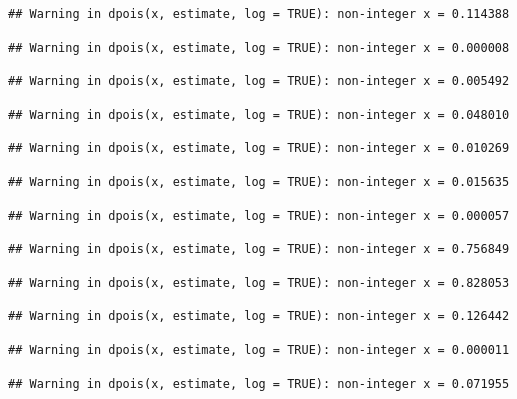 \documentclass[]{article}
\begin{document}
\begin{verbatim}
## Warning in dpois(x, estimate, log = TRUE): non-integer x = 0.114388
\end{verbatim}

\begin{verbatim}
## Warning in dpois(x, estimate, log = TRUE): non-integer x = 0.000008
\end{verbatim}

\begin{verbatim}
## Warning in dpois(x, estimate, log = TRUE): non-integer x = 0.005492
\end{verbatim}

\begin{verbatim}
## Warning in dpois(x, estimate, log = TRUE): non-integer x = 0.048010
\end{verbatim}

\begin{verbatim}
## Warning in dpois(x, estimate, log = TRUE): non-integer x = 0.010269
\end{verbatim}

\begin{verbatim}
## Warning in dpois(x, estimate, log = TRUE): non-integer x = 0.015635
\end{verbatim}

\begin{verbatim}
## Warning in dpois(x, estimate, log = TRUE): non-integer x = 0.000057
\end{verbatim}

\begin{verbatim}
## Warning in dpois(x, estimate, log = TRUE): non-integer x = 0.756849
\end{verbatim}

\begin{verbatim}
## Warning in dpois(x, estimate, log = TRUE): non-integer x = 0.828053
\end{verbatim}

\begin{verbatim}
## Warning in dpois(x, estimate, log = TRUE): non-integer x = 0.126442
\end{verbatim}

\begin{verbatim}
## Warning in dpois(x, estimate, log = TRUE): non-integer x = 0.000011
\end{verbatim}

\begin{verbatim}
## Warning in dpois(x, estimate, log = TRUE): non-integer x = 0.071955
\end{verbatim}
\end{document}
